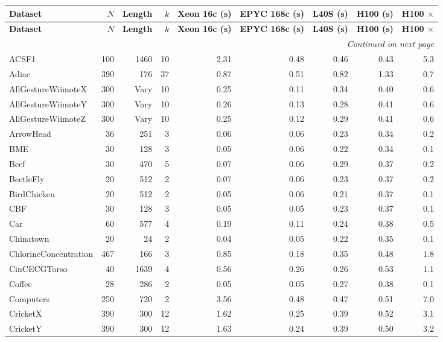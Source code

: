 \documentclass[11pt,landscape]{article}
\begin{document}
\begin{longtable}{lrrrrrrrr}
\toprule
\textbf{Dataset} & \textbf{$N$} & \textbf{Length} & \textbf{$k$} & \textbf{Xeon 16c (s)} & \textbf{EPYC 168c (s)} & \textbf{L40S (s)} & \textbf{H100 (s)} & \textbf{H100 $\times$} \\
\midrule
\endfirsthead
\toprule
\textbf{Dataset} & \textbf{$N$} & \textbf{Length} & \textbf{$k$} & \textbf{Xeon 16c (s)} & \textbf{EPYC 168c (s)} & \textbf{L40S (s)} & \textbf{H100 (s)} & \textbf{H100 $\times$} \\
\midrule
\endhead
\midrule
\multicolumn{9}{r}{\textit{Continued on next page}} \\
\endfoot
\bottomrule
\endlastfoot
ACSF1 & 100 & 1460 & 10 & 2.31 & 0.48 & 0.46 & 0.43 & 5.3 \\
Adiac & 390 & 176 & 37 & 0.87 & 0.51 & 0.82 & 1.33 & 0.7 \\
AllGestureWiimoteX & 300 & Vary & 10 & 0.25 & 0.11 & 0.34 & 0.40 & 0.6 \\
AllGestureWiimoteY & 300 & Vary & 10 & 0.26 & 0.13 & 0.28 & 0.41 & 0.6 \\
AllGestureWiimoteZ & 300 & Vary & 10 & 0.25 & 0.12 & 0.29 & 0.41 & 0.6 \\
ArrowHead & 36 & 251 & 3 & 0.06 & 0.06 & 0.23 & 0.34 & 0.2 \\
BME & 30 & 128 & 3 & 0.05 & 0.06 & 0.22 & 0.34 & 0.1 \\
Beef & 30 & 470 & 5 & 0.07 & 0.06 & 0.29 & 0.37 & 0.2 \\
BeetleFly & 20 & 512 & 2 & 0.07 & 0.06 & 0.23 & 0.37 & 0.2 \\
BirdChicken & 20 & 512 & 2 & 0.05 & 0.06 & 0.21 & 0.37 & 0.1 \\
CBF & 30 & 128 & 3 & 0.05 & 0.05 & 0.23 & 0.37 & 0.1 \\
Car & 60 & 577 & 4 & 0.19 & 0.11 & 0.24 & 0.38 & 0.5 \\
Chinatown & 20 & 24 & 2 & 0.04 & 0.05 & 0.22 & 0.35 & 0.1 \\
ChlorineConcentration & 467 & 166 & 3 & 0.85 & 0.18 & 0.35 & 0.48 & 1.8 \\
CinCECGTorso & 40 & 1639 & 4 & 0.56 & 0.26 & 0.26 & 0.53 & 1.1 \\
Coffee & 28 & 286 & 2 & 0.05 & 0.05 & 0.27 & 0.38 & 0.1 \\
Computers & 250 & 720 & 2 & 3.56 & 0.48 & 0.47 & 0.51 & 7.0 \\
CricketX & 390 & 300 & 12 & 1.62 & 0.25 & 0.39 & 0.52 & 3.1 \\
CricketY & 390 & 300 & 12 & 1.63 & 0.24 & 0.39 & 0.50 & 3.2 \\

\end{longtable}
\end{document}
